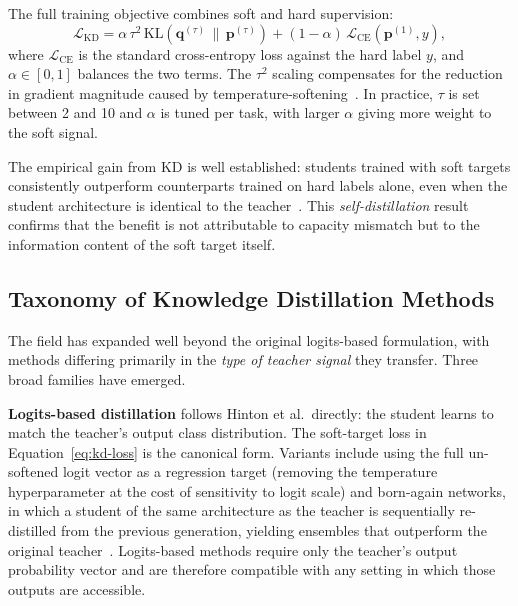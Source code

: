 \begin{foldable}
  The full training objective combines soft and hard supervision:
  \begin{equation}
    \mathcal{L}_{\mathrm{KD}}
    = \alpha \, \tau^{2} \, \mathrm{KL}\!\left(\mathbf{q}^{(\tau)} \,\|\, \mathbf{p}^{(\tau)}\right)
    + (1 - \alpha) \, \mathcal{L}_{\mathrm{CE}}\!\left(\mathbf{p}^{(1)}, y\right),
    \label{eq:kd-loss}
  \end{equation}
  where $\mathcal{L}_{\mathrm{CE}}$ is the standard cross-entropy loss against the hard label $y$, and $\alpha \in [0,1]$ balances the two terms.
  The $\tau^{2}$ scaling compensates for the reduction in gradient magnitude caused by temperature-softening~\cite{hinton2015distilling}.
  In practice, $\tau$ is set between 2 and 10 and $\alpha$ is tuned per task, with larger $\alpha$ giving more weight to the soft signal.
\end{foldable}

\begin{foldable}
  The empirical gain from KD is well established: students trained with soft targets consistently outperform counterparts trained on hard labels alone, even when the student architecture is identical to the teacher~\cite{hinton2015distilling}.
  This \emph{self-distillation} result confirms that the benefit is not attributable to capacity mismatch but to the information content of the soft target itself.
\end{foldable}

\subsection{Taxonomy of Knowledge Distillation Methods}
\label{sec:23-background-kdfoundations-taxonomy}

\begin{foldable}
  The field has expanded well beyond the original logits-based formulation, with methods differing primarily in the \emph{type of teacher signal} they transfer.
  Three broad families have emerged.
\end{foldable}

\begin{foldable}
  \textbf{Logits-based distillation} follows Hinton et al.\ directly: the student learns to match the teacher's output class distribution.
  The soft-target loss in Equation~\ref{eq:kd-loss} is the canonical form.
  Variants include using the full un-softened logit vector as a regression target (removing the temperature hyperparameter at the cost of sensitivity to logit scale) and born-again networks, in which a student of the same architecture as the teacher is sequentially re-distilled from the previous generation, yielding ensembles that outperform the original teacher~\cite{ba2014deep}.
  Logits-based methods require only the teacher's output probability vector and are therefore compatible with any setting in which those outputs are accessible.
\end{foldable}

